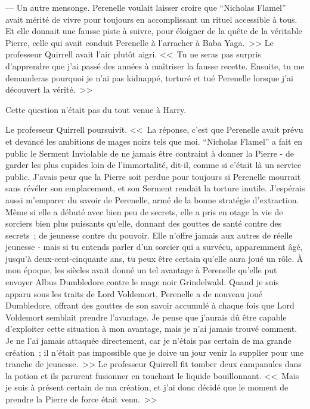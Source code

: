 --- Un autre mensonge. Perenelle voulait laisser croire que “Nicholas Flamel” avait mérité de vivre pour toujours en accomplissant un rituel accessible à tous. Et elle donnait une fausse piste à suivre, pour éloigner de la quête de la véritable Pierre, celle qui avait conduit Perenelle à l'arracher à Baba Yaga.~>> Le professeur Quirrell avait l'air plutôt aigri. <<~Tu ne seras pas surpris d'apprendre que j'ai passé des années à maîtriser la fausse recette. Ensuite, tu me demanderas pourquoi je n'ai pas kidnappé, torturé et tué Perenelle lorsque j'ai découvert la vérité.~>>

Cette question n'était pas du tout venue à Harry.

Le professeur Quirrell poursuivit. <<~La réponse, c'est que Perenelle avait prévu et devancé les ambitions de mages noirs tels que moi. “Nicholas Flamel” a fait en public le Serment Inviolable de ne jamais être contraint à donner la Pierre - de garder les plus cupides loin de l'immortalité, dit-il, comme si c'était là un service public. J'avais peur que la Pierre soit perdue pour toujours si Perenelle mourrait sans révéler son emplacement, et son Serment rendait la torture inutile. J'espérais aussi m'emparer du savoir de Perenelle, armé de la bonne stratégie d'extraction. Même si elle a débuté avec bien peu de secrets, elle a pris en otage la vie de sorciers bien plus puissants qu'elle, donnant des gouttes de santé contre des secrets~; de jeunesse contre du pouvoir. Elle n'offre jamais aux autres de réelle jeunesse - mais si tu entends parler d'un sorcier qui a survécu, apparemment âgé, jusqu'à deux-cent-cinquante ans, tu peux être certain qu'elle aura joué un rôle. À mon époque, les siècles avait donné un tel avantage à Perenelle qu'elle put envoyer Albus Dumbledore contre le mage noir Grindelwald. Quand je suis apparu sous les traits de Lord Voldemort, Perenelle a de nouveau joué Dumbledore, offrant des gouttes de son savoir accumulé à chaque fois que Lord Voldemort semblait prendre l'avantage. Je pense que j'aurais dû être capable d'exploiter cette situation à mon avantage, mais je n'ai jamais trouvé comment. Je ne l'ai jamais attaquée directement, car je n'étais pas certain de ma grande création~; il n'était pas impossible que je doive un jour venir la supplier pour une tranche de jeunesse.~>> Le professeur Quirrell fit tomber deux campanules dans la potion et ils parurent fusionner en touchant le liquide bouillonnant. <<~Mais je suis à présent certain de ma création, et j'ai donc décidé que le moment de prendre la Pierre de force était venu.~>>

